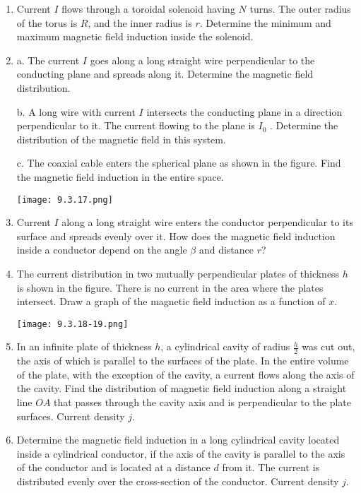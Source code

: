 \documentclass{article}
\begin{document}
\begin{enumerate}[label=9.3.\arabic*]
\item Current $I$ flows through a toroidal solenoid having $N$ turns. The outer radius of the torus is $R$, and the inner radius is $r$. Determine the minimum and maximum magnetic field induction inside the solenoid.

\item a. The current $I$ goes along a long straight wire perpendicular to the conducting plane and spreads along it. Determine the magnetic field distribution.


b. A long wire with current $I$ intersects the conducting plane in a direction perpendicular to it. The current flowing to the plane is $I_0$ . Determine the distribution of the magnetic field in this system. 

c. The coaxial cable enters the spherical plane as shown in the figure. Find the magnetic field induction in the entire space.

\begin{center}
    \texttt{[image: 9.3.17.png]}
\end{center}

\item Current $I$ along a long straight wire enters the conductor perpendicular to its surface and spreads evenly over it. How does the magnetic field induction inside a conductor depend on the angle $\beta$ and distance $r$? 

\item The current distribution in two mutually perpendicular plates of thickness $h$ is shown in the figure. There is no current in the area where the plates intersect. Draw a graph of the magnetic field induction as a function of $x$.

\begin{center}
    \texttt{[image: 9.3.18-19.png]}
\end{center}

\item In an infinite plate of thickness $h$, a cylindrical cavity of radius $\frac{h}{2}$ was cut out, the axis of which is parallel to the surfaces of the plate. In the entire volume of the plate, with the exception of the cavity, a current flows along the axis of the cavity. Find the distribution of magnetic field induction along a straight line $OA$ that passes through the cavity axis and is perpendicular to the plate surfaces. Current density $j$.

\item Determine the magnetic field induction in a long cylindrical cavity located inside a cylindrical conductor, if the axis of the cavity is parallel to the axis of the conductor and is located at a distance $d$ from it. The current is distributed evenly over the cross-section of the conductor. Current density $j$.


\end{enumerate}
\end{document}
